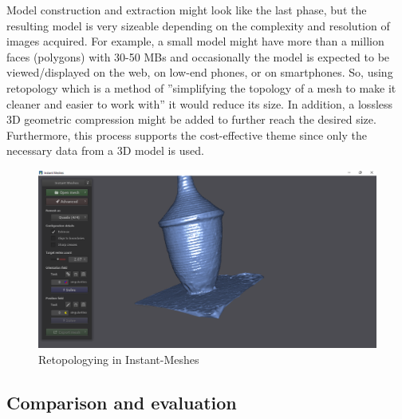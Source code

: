 \documentclass[conference]{IEEEtran}
\begin{document}
Model construction and extraction might look like the last phase, but the resulting model is very sizeable depending on the complexity and resolution of images acquired. For example, a small model might have more than a million faces (polygons) with 30-50 MBs \cite{Lauria2022} and occasionally the model is expected to be viewed/displayed on the web, on low-end phones, or on smartphones. So, using retopology which is a method of ”simplifying the topology of a mesh to make it cleaner and easier to work with” \cite{reto} it would reduce its size. In addition, a lossless 3D geometric compression \cite{draco} might be added to further reach the desired size. Furthermore, this process supports the cost-effective theme since only the necessary data from a 3D model is used.

\begin{figure}[H]
    \centering
    \includegraphics[width=\linewidth]{images/IM.png}
    \caption{Retopologying in Instant-Meshes}
    \label{fig:two}
\end{figure}

\subsection{Comparison and evaluation}
\end{document}

